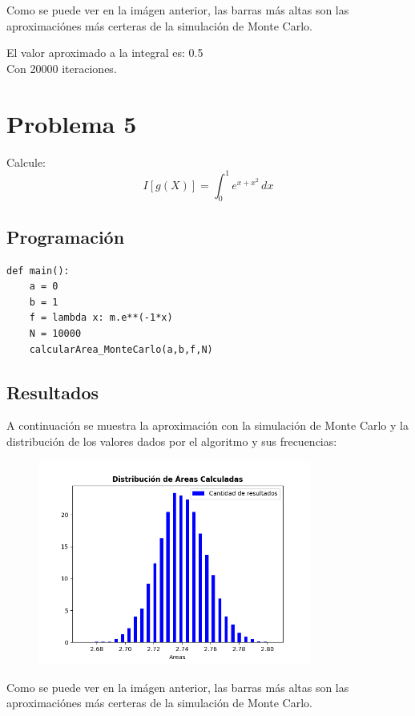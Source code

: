 \documentclass[a4paper,12pt]{article}
\begin{document}
Como se puede ver en la imágen anterior, las barras más altas son 
las aproximaciónes más certeras de la simulación de Monte Carlo.

El valor aproximado a la integral es: 0.5\\
Con 20000 iteraciones.
\newpage
\section{Problema 5}
    Calcule:
    \begin{equation}
        I[g(X)] = \int_{0}^{1} e^{x+x^2} \,dx
    \end{equation}
    \subsection{Programación}
\begin{lstlisting}
def main():
    a = 0
    b = 1
    f = lambda x: m.e**(-1*x) 
    N = 10000
    calcularArea_MonteCarlo(a,b,f,N)
\end{lstlisting}

    \subsection{Resultados}
    A continuación se muestra la aproximación con la simulación de Monte Carlo y 
    la distribución de los valores dados por el algoritmo y sus frecuencias:
    \begin{figure}[h]
        \centering
        \includegraphics[width=0.8\textwidth]{ejer5.png}
    \end{figure}
    
    Como se puede ver en la imágen anterior, las barras más altas son 
    las aproximaciónes más certeras de la simulación de Monte Carlo.
    
\end{document}
